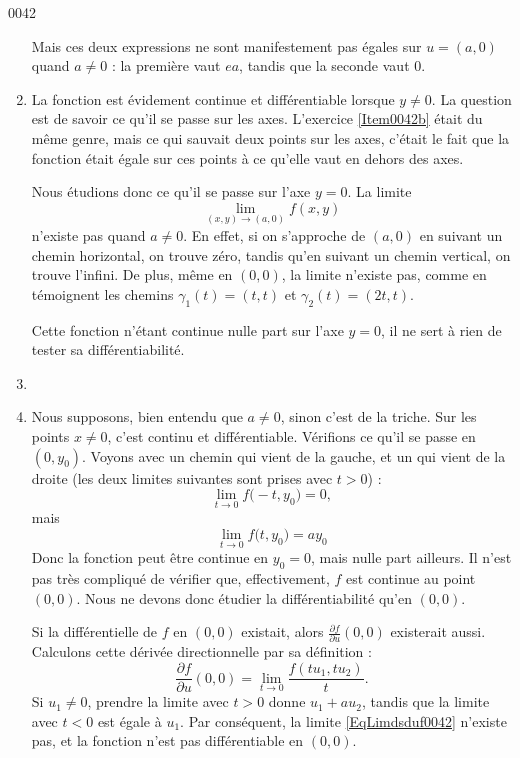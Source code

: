 \begin{corrige}{0042}
\begin{alternative}
\begin{enumerate}
Mais ces deux expressions ne sont manifestement pas égales sur $u=(a,0)$ quand $a\neq0$ : la première vaut $ea$, tandis que la seconde vaut $0$.

\item
La fonction est évidement continue et différentiable lorsque $y\neq 0$. La question est de savoir ce qu'il se passe sur les axes. L'exercice \ref{Item0042b} était du même genre, mais ce qui sauvait deux points sur les axes, c'était le fait que la fonction était égale sur ces points à ce qu'elle vaut en dehors des axes.

Nous étudions donc ce qu'il se passe sur l'axe $y=0$. La limite
\begin{equation}
	\lim_{(x,y)\to(a,0)}f(x,y)
\end{equation}
n'existe pas quand $a\neq 0$. En effet, si on s'approche de $(a,0)$ en suivant un chemin horizontal, on trouve zéro, tandis qu'en suivant un chemin vertical, on trouve l'infini. De plus, même en $(0,0)$, la limite n'existe pas, comme en témoignent les chemins $\gamma_1(t)=(t,t)$ et $\gamma_2(t)=(2t,t)$.

Cette fonction n'étant continue nulle part sur l'axe $y=0$, il ne sert à rien de tester sa différentiabilité.

\item

\item Nous supposons, bien entendu que $a\neq 0$, sinon c'est de la triche. Sur les points $x\neq 0$, c'est continu et différentiable. Vérifions ce qu'il se passe en $(0,y_0)$. Voyons avec un chemin qui vient de la gauche, et un qui vient de la droite (les deux limites suivantes sont prises avec $t>0$) :
\begin{equation}
	\lim_{t\to 0}f\big( -t,y_0 \big)=0,
\end{equation}
mais
\begin{equation}
	\lim_{t\to 0}f\big( t,y_0 \big)=ay_0
\end{equation}
Donc la fonction peut être continue en $y_0=0$, mais nulle part ailleurs. Il n'est pas très compliqué de vérifier que, effectivement, $f$ est continue au point $(0,0)$. Nous ne devons donc étudier la différentiabilité qu'en $(0,0)$.

Si la différentielle de $f$ en $(0,0)$ existait, alors $\frac{ \partial f }{ \partial u }(0,0)$ existerait aussi. Calculons cette dérivée directionnelle par sa définition :
\begin{equation}	\label{EqLimdsduf0042}
	\frac{ \partial f }{ \partial u }(0,0)=\lim_{t\to 0}\frac{ f(tu_1,tu_2) }{ t }.
\end{equation}
Si $u_1\neq 0$, prendre la limite avec $t>0$ donne $u_1+au_2$, tandis que la limite avec $t<0$ est égale à $u_1$. Par conséquent, la limite \eqref{EqLimdsduf0042} n'existe pas, et la fonction n'est pas différentiable en $(0,0)$.


\end{enumerate}
\end{alternative}
\end{corrige}
